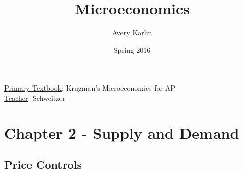 \documentclass[11 pt, twoside]{article}
\begin{document}
\title{Microeconomics}
\author{Avery Karlin}
\date{Spring 2016}
\newcommand{\textbook}{Krugman's Microeconomics for AP}
\newcommand{\teacher}{Schweitzer}

\maketitle
\newpage
\tableofcontents
\vspace{11pt}
\noindent
\underline{Primary Textbook}: \textbook\\
\underline{Teacher}: \teacher
\newpage

\section{Chapter 2 - Supply and Demand}

\subsection{Price Controls}
\end{document}
